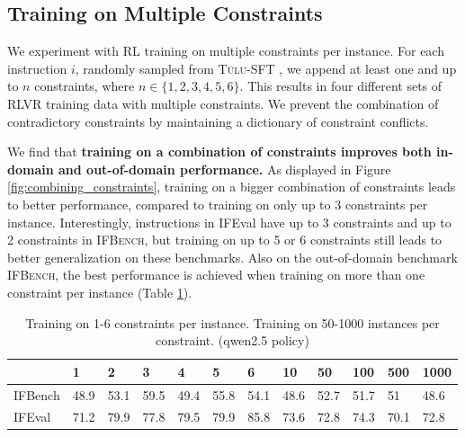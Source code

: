\documentclass{article}
\newcommand{\benchname}{\textsc{IFBench}\xspace}
\newcommand{\tulu}{\textsc{T\"ulu}\xspace}
\begin{document}
\subsection{Training on Multiple Constraints}
We experiment with RL training on multiple constraints per instance. For each instruction $i$, randomly sampled from \tulu-SFT \cite{lambert2024t}, we append at least one and up to $n$ constraints, where $n \in \{1, 2, 3, 4, 5, 6\}$. This results in four different sets of RLVR training data with multiple constraints. We prevent the combination of contradictory constraints by maintaining a dictionary of constraint conflicts.

We find that \textbf{training on a combination of constraints improves both in-domain and out-of-domain performance.} As displayed in Figure \ref{fig:combining_constraints}, training on a bigger combination of constraints leads to better performance, compared to training on only up to 3 constraints per instance. Interestingly, instructions in IFEval have up to 3 constraints and up to 2 constraints in \benchname, but training on up to 5 or 6 constraints still leads to better generalization on these benchmarks. Also on the out-of-domain benchmark \benchname, the best performance is achieved when training on more than one constraint per instance (Table \ref{tab:number_instances}).


\begin{table}[]
  \caption{Training on 1-6 constraints per instance. Training on 50-1000 instances per constraint. (qwen2.5 policy)}
  \label{tab:number_instances}
  \centering
\begin{tabular}{llllllllllll} \toprule
                                              & \cellcolor{blue!10}1 & \cellcolor{blue!10} 2 & \cellcolor{blue!10} 3 & \cellcolor{blue!10}4 & \cellcolor{blue!10}5 & \cellcolor{blue!10}6 & \cellcolor{blue!20}10 & \cellcolor{blue!20}50 & \cellcolor{blue!20}100 & \cellcolor{blue!20}500 & \cellcolor{blue!20}1000 \\ \midrule
\cellcolor{yellow!30}IFBench & 48.9                                  & 53.1                                   &                  59.5                     & 49.4                                 & 55.8                                  & 54.1                                  & 48.6                                   & 52.7                                   & 51.7                                    & 51                                      & 48.6                                     \\
IFEval                                        & 71.2                                 & 79.9                                  &              77.8                         & 79.5                                 & 79.9                                  & 85.8                                 & 73.6                                   &   72.8                                     & 74.3                                    & 70.1                                    & 72.8    \\ \bottomrule                                
\end{tabular}
\end{table}
\end{document}
